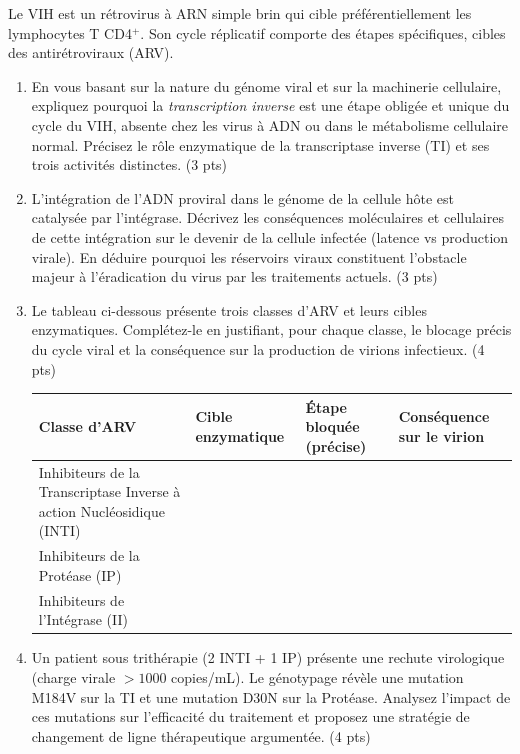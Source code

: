 \documentclass[11pt]{article}
\begin{document}
\begin{exercice}
Le VIH est un rétrovirus à ARN simple brin qui cible préférentiellement les lymphocytes T CD4$^+$. Son cycle réplicatif comporte des étapes spécifiques, cibles des antirétroviraux (ARV).
\begin{enumerate}
    \item En vous basant sur la nature du génome viral et sur la machinerie cellulaire, expliquez pourquoi la \textit{transcription inverse} est une étape obligée et unique du cycle du VIH, absente chez les virus à ADN ou dans le métabolisme cellulaire normal. Précisez le rôle enzymatique de la transcriptase inverse (TI) et ses trois activités distinctes. (3 pts)
    \item L'intégration de l'ADN proviral dans le génome de la cellule hôte est catalysée par l'intégrase. Décrivez les conséquences moléculaires et cellulaires de cette intégration sur le devenir de la cellule infectée (latence vs production virale). En déduire pourquoi les réservoirs viraux constituent l'obstacle majeur à l'éradication du virus par les traitements actuels. (3 pts)
    \item Le tableau ci-dessous présente trois classes d'ARV et leurs cibles enzymatiques. Complétez-le en justifiant, pour chaque classe, le blocage précis du cycle viral et la conséquence sur la production de virions infectieux. (4 pts)
    \begin{center}
    \begin{tabular}{|p{2.5cm}|p{3cm}|p{4cm}|p{4cm}|}
    \hline
    \textbf{Classe d'ARV} & \textbf{Cible enzymatique} & \textbf{Étape bloquée (précise)} & \textbf{Conséquence sur le virion} \\
    \hline
    Inhibiteurs de la Transcriptase Inverse à action Nucléosidique (INTI) & & & \\
    \hline
    Inhibiteurs de la Protéase (IP) & & & \\
    \hline
    Inhibiteurs de l'Intégrase (II) & & & \\
    \hline
    \end{tabular}
    \end{center}
    \item Un patient sous trithérapie (2 INTI + 1 IP) présente une rechute virologique (charge virale $> 1000$ copies/mL). Le génotypage révèle une mutation M184V sur la TI et une mutation D30N sur la Protéase. Analysez l'impact de ces mutations sur l'efficacité du traitement et proposez une stratégie de changement de ligne thérapeutique argumentée. (4 pts)
\end{enumerate}
\end{exercice}
\end{document}
